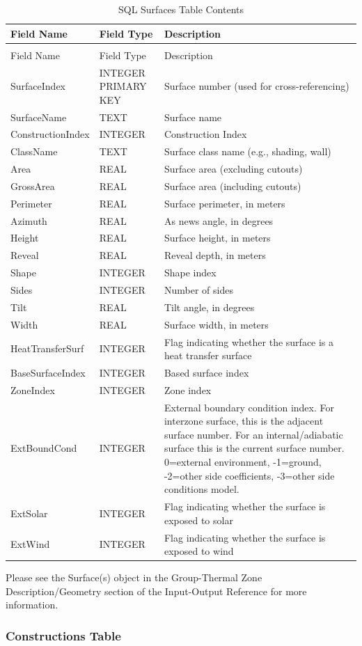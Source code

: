 \begin{longtable}[c]{>{\raggedright}p{1.5in}>{\raggedright}p{1.5in}>{\raggedright}p{3.0in}}
\caption{SQL Surfaces Table Contents \label{table:table-25.-sql-surfaces-table-contents}} \tabularnewline
\toprule
Field Name & Field Type & Description \tabularnewline
\midrule
\endfirsthead

\caption[]{SQL Surfaces Table Contents} \tabularnewline
\toprule
Field Name & Field Type & Description \tabularnewline
\midrule
\endhead

SurfaceIndex & INTEGER PRIMARY KEY & Surface number (used for cross-referencing) \tabularnewline
SurfaceName & TEXT & Surface name \tabularnewline
ConstructionIndex & INTEGER & Construction Index \tabularnewline
ClassName & TEXT & Surface class name (e.g., shading, wall) \tabularnewline
Area & REAL & Surface area (excluding cutouts) \tabularnewline
GrossArea & REAL & Surface area (including cutouts) \tabularnewline
Perimeter & REAL & Surface perimeter, in meters \tabularnewline
Azimuth & REAL & As news angle, in degrees \tabularnewline
Height & REAL & Surface height, in meters \tabularnewline
Reveal & REAL & Reveal depth, in meters \tabularnewline
Shape & INTEGER & Shape index \tabularnewline
Sides & INTEGER & Number of sides \tabularnewline
Tilt & REAL & Tilt angle, in degrees \tabularnewline
Width & REAL & Surface width, in meters \tabularnewline
HeatTransferSurf & INTEGER & Flag indicating whether the surface is a heat transfer surface \tabularnewline
BaseSurfaceIndex & INTEGER & Based surface index \tabularnewline
ZoneIndex & INTEGER & Zone index \tabularnewline
ExtBoundCond & INTEGER & External boundary condition index. For interzone surface, this is the adjacent surface number. For an internal/adiabatic surface this is the current surface number. 0=external environment, -1=ground, -2=other side coefficients, -3=other side conditions model. \tabularnewline
ExtSolar & INTEGER & Flag indicating whether the surface is exposed to solar \tabularnewline
ExtWind & INTEGER & Flag indicating whether the surface is exposed to wind \tabularnewline
\bottomrule
\end{longtable}

Please see the Surface(s) object in the Group-Thermal Zone Description/Geometry section of the Input-Output Reference for more information.

\subsubsection{Constructions Table}

